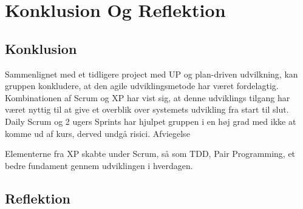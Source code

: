 \chapter{Konklusion Og Reflektion}\label{ch:KonklusionReflektion}

\section{Konklusion}


Sammenlignet med et tidligere project med UP og plan-driven udvilkning, kan gruppen konkludere, at den agile udviklingsmetode har været fordelagtig. Kombinationen af Scrum og XP har vist sig, at denne udviklings tilgang har været nyttig til at give et overblik over systemets udvikling fra start til slut. Daily Scrum og 2 ugers Sprints har hjulpet gruppen i en høj grad med ikke at komme ud af kurs, derved undgå risici. Afviegelse 



 Elementerne fra XP skabte under Scrum, så som TDD, Pair Programming, et bedre fundament gennem udviklingen i hverdagen. 



\section{Reflektion}
